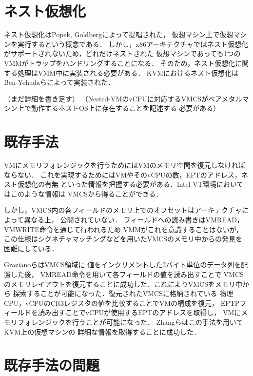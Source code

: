 \section{ネスト仮想化}
\label{sec:nested_virtualization}

ネスト仮想化はPopek, Goldberg\cite{popek_goldberg}によって提唱された，
仮想マシン上で仮想マシンを実行するという概念である．
しかし，x86アーキテクチャではネスト仮想化がサポートされないため，どれだけネストされた
仮想マシンであっても1つのVMMがトラップをハンドリングすることになる．
そのため，ネスト仮想化に関する処理はVMM中に実装される必要がある．
KVMにおけるネスト仮想化はBen-Yehudaらによって実装された\cite{turtles}．

（まだ詳細を書き足す）
（Nested-VMのvCPUに対応するVMCSがベアメタルマシン上で動作するホストOS上に存在することを記述する
必要がある）

\section{既存手法}
\label{subsec:existing_method}

VMにメモリフォレンジックを行うためにはVMのメモリ空間を復元しなければならない．
これを実現するためにはVMやそのvCPUの数，EPTのアドレス，ネスト仮想化の有無
といった情報を把握する必要がある．Intel VT環境においてはこのような情報は
VMCSから得ることができる．

しかし，VMCS内の各フィールドのメモリ上でのオフセットはアーキテクチャによって異なる上，
公開されていない．
フィールドへの読み書きはVMREAD，VMWRITE命令を通じて行われるため
VMMがこれを意識することはないが，
この仕様はシグネチャマッチングなどを用いたVMCSのメモリ中からの発見を
困難にしている．

Grazianoら\cite{hypervisor_memory_forensics}はVMCS領域に
値をインクリメントした2バイト単位のデータ列を配置した後，
VMREAD命令を用いて各フィールドの値を読み出すことで
VMCSのメモリレイアウトを復元することに成功した．これによりVMCSをメモリ中から
探索することが可能になった．復元されたVMCSに格納されている
物理CPU，vCPUのCR3レジスタの値を比較することでVMの構成を復元，
EPTPフィールドを読み出すことでvCPUが使用するEPTのアドレスを取得し，
VMにメモリフォレンジックを行うことが可能になった．
Zhangら\cite{kvm_vm_forensics}はこの手法を用いてKVM上の仮想マシンの
詳細な情報を取得することに成功した．

\section{既存手法の問題}
\label{subsec:problem_with_existing_method}

